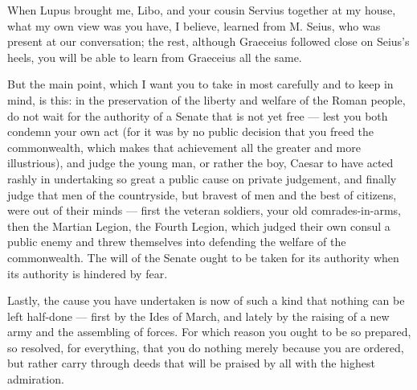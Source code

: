 

 When Lupus brought me, Libo, and your cousin Servius together at my house, what my own view was you have, I believe, learned from M. Seius, who was present at our conversation; the rest, although Graeceius followed close on Seius's heels, you will be able to learn from Graeceius all the same.

 But the main point, which I want you to take in most carefully and to keep in mind, is this: in the preservation of the liberty and welfare of the Roman people, do not wait for the authority of a Senate that is not yet free --- lest you both condemn your own act (for it was by no public decision that you freed the commonwealth, which makes that achievement all the greater and more illustrious), and judge the young man, or rather the boy, Caesar to have acted rashly in undertaking so great a public cause on private judgement, and finally judge that men of the countryside, but bravest of men and the best of citizens, were out of their minds --- first the veteran soldiers, your old comrades-in-arms, then the Martian Legion, the Fourth Legion, which judged their own consul a public enemy and threw themselves into defending the welfare of the commonwealth. The will of the Senate ought to be taken for its authority when its authority is hindered by fear.

 Lastly, the cause you have undertaken is now of such a kind that nothing can be left half-done --- first by the Ides of March, and lately by the raising of a new army and the assembling of forces. For which reason you ought to be so prepared, so resolved, for everything, that you do nothing merely because you are ordered, but rather carry through deeds that will be praised by all with the highest admiration.
